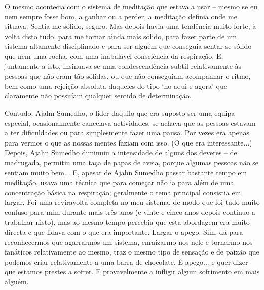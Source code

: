 O mesmo acontecia com o sistema de meditação que estava a usar -- mesmo se eu nem sempre fosse bom, a ganhar ou a perder, a meditação definia onde me situava. Sentia-me sólido, seguro. Mas depois havia uma tendência muito forte, à volta disto tudo, para me tornar ainda mais sólido, para fazer parte de um sistema altamente disciplinado e para ser alguém que conseguia sentar-se sólido que nem uma rocha, com uma inabalável consciência da respiração. E, juntamente a isto, insinuava-se uma condescendência subtil relativamente às pessoas que não eram tão sólidas, ou que não conseguiam acompanhar o ritmo, bem como uma rejeição absoluta daqueles do tipo `no aqui e agora' que claramente não possuíam qualquer sentido de determinação.

Contudo, Ajahn Sumedho, o líder daquilo que era suposto ser uma equipa especial, ocasionalmente cancelava actividades, se achava que as pessoas estavam a ter dificuldades ou para simplesmente fazer uma pausa. Por vezes era apenas para vermos o que as nossas mentes faziam com isso. (O que era interessante...) Depois, Ajahn Sumedho diminuiu a intensidade de alguns dos deveres -- de madrugada, permitiu uma taça de papas de aveia, porque algumas pessoas não se sentiam muito bem... E, apesar de Ajahn Sumedho passar bastante tempo em meditação, usava uma técnica que para começar não ia para além de uma concentração básica na respiração; geralmente o tema principal consistia em largar. Foi uma reviravolta completa no meu sistema, de modo que foi tudo muito confuso para mim durante mais três anos (e vinte e cinco anos depois continuo a trabalhar nisto), mas ao mesmo tempo percebia que esta abordagem era muito directa e que lidava com o que era importante. Largar o apego. Sim, dá para reconhecermos que agarrarmos um sistema, enraizarmo-nos nele e tornarmo-nos fanáticos relativamente ao mesmo, traz o mesmo tipo de sensação e de paixão que podemos criar relativamente a uma barra de chocolate. É apego... e quer dizer que estamos prestes a sofrer. E provavelmente a infligir algum sofrimento em mais alguém.

